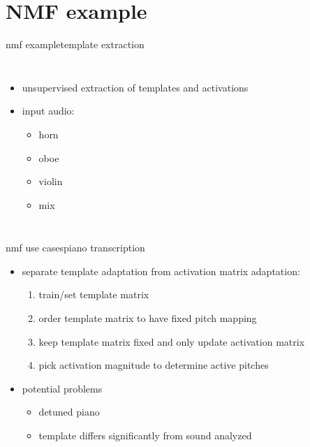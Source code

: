     \section[example]{NMF example}
        \begin{frame}{nmf example}{template extraction}
            \vspace{-3mm}
            \begin{columns}
                    \begin{itemize}
                        \item   unsupervised extraction of templates and activations
                        \item   input audio: 
                            \begin{itemize}
                                \item  {} horn
                                \item  {} oboe
                                \item  {} violin
                                \item  {} mix
                            \end{itemize}
                    \end{itemize}
            \end{columns}
        \end{frame}
        
        \begin{frame}{nmf use cases}{piano transcription}
            \begin{itemize}
                \item   separate template adaptation from activation matrix adaptation:
                    \begin{enumerate}
                        \item  train/set template matrix
                        \item  order template matrix to have fixed pitch mapping
                        \item  keep template matrix fixed and only update activation matrix
                        \item  pick activation magnitude to determine active pitches
                    \end{enumerate}
                \bigskip
                \item   potential problems
                    \begin{itemize}
                        \item   detuned piano
                        \item   template differs significantly from sound analyzed
                    \end{itemize}
            \end{itemize}
        \end{frame}
        
